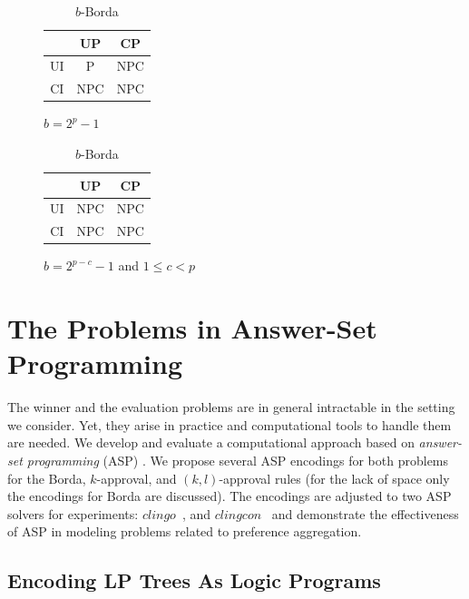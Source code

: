 \begin{table}
	\centering
  \begin{subfigure}[b]{0.5\textwidth}
		\centering
		\begin{tabular}[0.5\textwidth]{ | c | c | c | }
		  \hline
		    & UP & CP \\
		  \hline
		  UI & P & NPC \\
		  \hline
		  CI & NPC & NPC \\
		  \hline
		\end{tabular}
		\caption{$b=2^p-1$}
		\label{tbl:bBorda_comp_a}
	\end{subfigure}%
  \begin{subfigure}[b]{0.5\textwidth}
		\centering
		\begin{tabular}[0.5\textwidth]{ | c | c | c | }
		  \hline
		    & UP & CP \\
		  \hline
		  UI & NPC & NPC \\
		  \hline
		  CI & NPC & NPC \\
		  \hline
		\end{tabular}
		\caption{$b=2^{p-c}-1$ and $1 \leq c < p$}
		\label{tbl:bBorda_comp_b}
	\end{subfigure}
	\caption{$b$-Borda}
	\label{tbl:bBorda_comp}
\end{table}


\section{The Problems in Answer-Set Programming}

The winner and the evaluation problems are in general intractable in 
the setting we consider. Yet, they arise in practice and computational
tools to handle them are needed. We develop and evaluate
a computational approach based on \textit{answer-set programming} (ASP) 
\cite{mt99:stable}. We propose several ASP encodings for 
both problems for the Borda, $k$-approval, and
$(k,l)$-approval rules 
(for the lack of space only the encodings for Borda are discussed). 
The encodings are adjusted to two
ASP solvers for experiments: $\mathit{clingo}$~\cite{Gebser:clingo}, 
and $\mathit{clingcon}$~\cite{Ostrowski:clingcon} and demonstrate
the effectiveness of ASP in modeling problems related to preference 
aggregation.
  

\subsection{Encoding LP Trees As Logic Programs}

